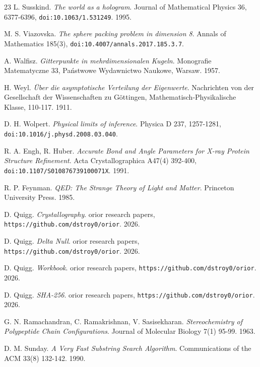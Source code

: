 \begin{thebibliography}{23}
L. Susskind. \emph{The world as a hologram}. Journal of Mathematical Physics 36, 6377-6396, \texttt{doi:10.1063/\allowbreak{}1.531249}. 1995.

M. S. Viazovska. \emph{The sphere packing problem in dimension 8}. Annals of Mathematics 185(3), \texttt{doi:10.4007/\allowbreak{}annals.2017.185.3.7}.

A. Walfisz. \emph{Gitterpunkte in mehrdimensionalen Kugeln}. Monografie Matematyczne 33, Państwowe Wydawnictwo Naukowe, Warsaw. 1957.

H. Weyl. \emph{Über die asymptotische Verteilung der Eigenwerte}. Nachrichten von der Gesellschaft der Wissenschaften zu Göttingen, Mathematisch-Physikalische Klasse, 110-117. 1911.

D. H. Wolpert. \emph{Physical limits of inference}. Physica D 237, 1257-1281, \texttt{doi:10.1016/\allowbreak{}j.physd.2008.03.040}.

R. A. Engh, R. Huber. \emph{Accurate Bond and Angle Parameters for X-ray Protein Structure Refinement}. Acta Crystallographica A47(4) 392-400, \texttt{doi:10.1107/\allowbreak{}S010876739100071X}. 1991.

R. P. Feynman. \emph{QED: The Strange Theory of Light and Matter}. Princeton University Press. 1985.

D. Quigg. \emph{Crystallography}. orior research papers, \texttt{https:/\allowbreak{}/\allowbreak{}github.com/\allowbreak{}dstroy0/\allowbreak{}orior}. 2026.

D. Quigg. \emph{Delta Null}. orior research papers, \texttt{https:/\allowbreak{}/\allowbreak{}github.com/\allowbreak{}dstroy0/\allowbreak{}orior}. 2026.

D. Quigg. \emph{Workbook}. orior research papers, \texttt{https:/\allowbreak{}/\allowbreak{}github.com/\allowbreak{}dstroy0/\allowbreak{}orior}. 2026.

D. Quigg. \emph{SHA-256}. orior research papers, \texttt{https:/\allowbreak{}/\allowbreak{}github.com/\allowbreak{}dstroy0/\allowbreak{}orior}. 2026.

G. N. Ramachandran, C. Ramakrishnan, V. Sasisekharan. \emph{Stereochemistry of Polypeptide Chain Configurations}. Journal of Molecular Biology 7(1) 95-99. 1963.

D. M. Sunday. \emph{A Very Fast Substring Search Algorithm}. Communications of the ACM 33(8) 132-142. 1990.

\end{thebibliography}
